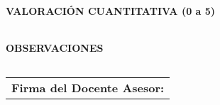 \documentclass[a4paper,12pt]{article}
\begin{document}
\vspace{0.5cm}
\noindent
\textbf{VALORACIÓN CUANTITATIVA (0 a 5)}
\begin{tabularx}{\textwidth}{|X|}
    \hline
    \vspace{1cm} \\ \hline
\end{tabularx}

\vspace{0.5cm}
\noindent
\textbf{OBSERVACIONES}
\begin{tabularx}{\textwidth}{|X|}
    \hline
    \vspace{3cm} \\ \hline
\end{tabularx}

\vspace{0.5cm}
\begin{center}
    \begin{tabular}{p{7cm}}
        \hline
        \textbf{Firma del Docente Asesor:} \hrulefill \\
    \end{tabular}
\end{center}
\end{document}
